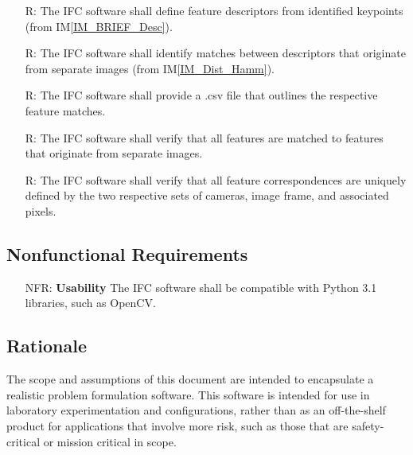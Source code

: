 \documentclass[12pt]{article}
\newcommand{\iref}[1]{IM\ref{#1}}
\newcounter{reqnum} %
\newcounter{nfrnum} %
\begin{document}
\begin{itemize}
\item[R\refstepcounter{reqnum}\thereqnum \label{R_DefineDescriptors}:] The IFC software shall 
define feature descriptors from identified keypoints (from \iref{IM_BRIEF_Desc}).

\item[R\refstepcounter{reqnum}\thereqnum \label{R_CompareDescriptors}:] The IFC software shall 
identify matches between descriptors that originate from separate images (from \iref{IM_Dist_Hamm}).

\item[R\refstepcounter{reqnum}\thereqnum \label{R_OutputCorrespondences}:] The IFC software shall 
provide a .csv file that outlines the respective feature matches.

\item[R\refstepcounter{reqnum}\thereqnum \label{R_DistinctImages}:] The IFC software shall verify 
that all features are matched to features that originate from separate images.

\item[R\refstepcounter{reqnum}\thereqnum \label{R_UniqueMatch_IDs}:] The IFC software shall verify 
that all feature correspondences are uniquely defined by the two respective sets of cameras, image frame, 
and associated pixels.

\end{itemize}

\subsection{Nonfunctional Requirements}

\noindent \begin{itemize}

\item[NFR\refstepcounter{nfrnum}\thenfrnum \label{NFR_Usability}:] \textbf{Usability}
  The IFC software shall be compatible with Python 3.1 libraries, such as OpenCV.



\end{itemize}

\subsection{Rationale}

The scope and assumptions of this document are intended to encapsulate a realistic problem formulation 
software. This software is intended for use in laboratory experimentation and configurations, rather than 
as an off-the-shelf product for applications that involve more risk, such as those that are safety-critical 
or mission critical in scope.
\end{document}
